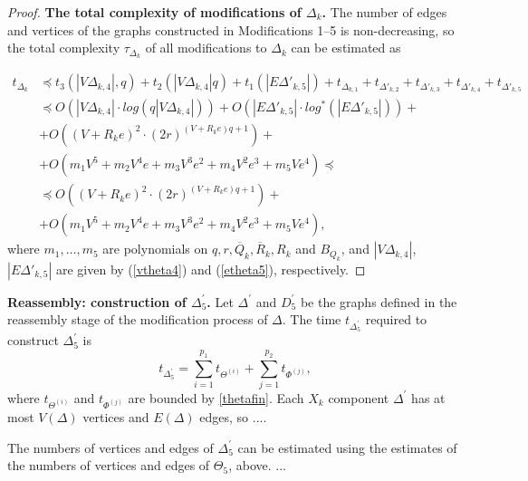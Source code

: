 \documentclass[a4paper,12pt]{article}
\newcommand{\D}{\Delta }
\renewcommand{\t}{\tau }
\numberwithin{equation}{section}
\numberwithin{figure}{section}
\begin{document}
\begin{proof}
{\bf The total complexity of modifications of $\D_k$.} The number of
edges and vertices of the graphs constructed in Modifications 1--5 is non-decreasing, so the
total complexity $\t_{\D_k}$ of all modifications to $\D_k$ can be estimated as

\begin{equation}\label{thetafin}
\begin{split}
t_{\D_k} &\preceq t_3(|V \D_{k,4}|, q) + t_2(|V \D_{k,4}| q )+
t_1(|E\D'_{k,5}|)+t_{\D_{k,1}} + t_{\D'_{k,2}}+t_{\D'_{k,3}}+t_{\D'_{k,4}}+t_{\D'_{k,5}}\\
&\preceq O(|V \D_{k,4}|\cdot log(q |V \D_{k,4}|))+O (|E\D'_{k,5}| \cdot log^{\ast}(|E\D'_{k,5}|))+\\
&+O((V +R_k e)^2\cdot (2r)^{(V + R_k e) q +1})+\\
&+O(m_1 V^5 + m_2V^4 e +m_3 V^3 e^2 +m_4 V^2 e^3 + m_5 V e^4)\preceq\\
&\preceq O((V +R_k e)^2\cdot (2r)^{(V + R_k e) q +1})+ \\
&+O(m_1 V^5 + m_2V^4 e +m_3 V^3 e^2 +m_4 V^2 e^3 + m_5 V e^4),
\end{split}
\end{equation}
where $m_1, \ldots, m_5$ are polynomials on  $q, r,
\overline{Q}_k, \overline{R}_k, R_k$ and $B_{Q_k}$, and $|V
\D_{k,4}|$, $|E\D'_{k,5}|$ are given by (\ref{vtheta4}) and
(\ref{etheta5}), respectively.

\end{proof}

{\bf Reassembly: construction of $\D^\prime_5$.}
Let $\D^\prime$ and $D^\prime_5$ be the graphs defined in the
reassembly stage of the modification process of $\D$.
The time  $t_{\D^\prime_5}$ required to  construct $\D^{\prime}_5$
is %
\begin{equation}\label{eq:D'}
t_{\D^\prime_5}=\sum_{i=1}^{p_1} t_{\Theta^{(i)}}+
\sum_{j=1}^{p_2} t_{\Phi^{(j)}},
\end{equation}
where  $t_{\Theta^{(i)}}$ and $t_{\Phi^{(j)}}$ are bounded by \eqref{thetafin}.
Each $X_k$ component $\D^\prime$ has at most $V(\D)$ vertices
and $E(\D)$ edges, so ....


The numbers of vertices and edges of $\D_5^\prime$ can be estimated
using the estimates of the numbers of vertices and edges of $\Theta_5$, above.
...
\end{document}
